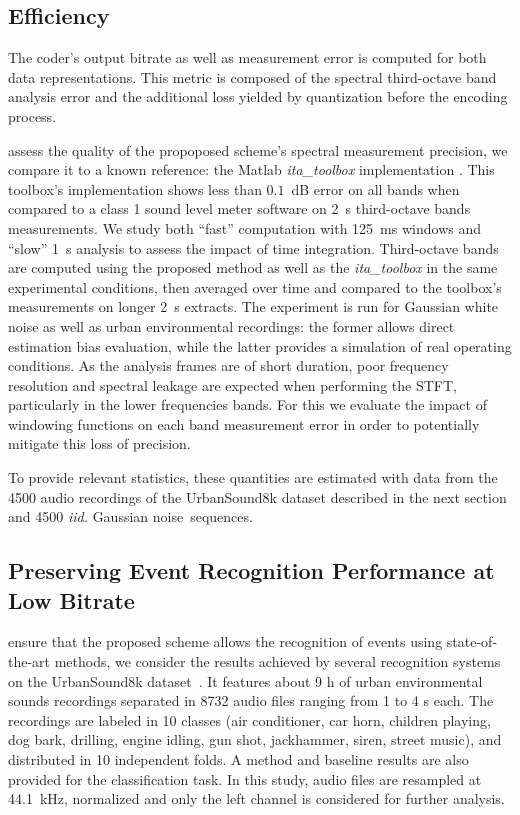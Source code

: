 \documentclass[sensors,article,accept,moreauthors,pdftex,10pt,a4paper]{mdpi}
\begin{document}
\subsection{Efficiency} \label{sec:efficiency_p}

The coder's output bitrate as well as measurement error is computed for both data representations. This metric is composed of the spectral third-octave band analysis error and the additional loss yielded by quantization before the encoding process.

 assess the quality of the propoposed scheme's spectral measurement precision, we compare it to a known reference: the Matlab \textit{ita\_toolbox} implementation \cite{itatoolbox2017}. This toolbox's implementation shows less than $0.1$~dB error on all bands when compared to a class 1 sound level meter software on 2~s third-octave bands measurements. We study both ``fast'' computation with 125~ms windows and ``slow'' 1~s analysis to assess the impact of time integration. Third-octave bands are computed using the proposed method as well as the \textit{ita\_toolbox} in the same experimental conditions, then averaged over time and compared to the toolbox's measurements on longer 2~s extracts. The experiment is run for Gaussian white noise as well as urban environmental recordings: the former allows direct estimation bias evaluation, while the latter provides a simulation of real operating conditions. As the analysis frames are of short duration, poor frequency resolution and spectral leakage are expected when performing the STFT, particularly in the lower frequencies bands. For this  we evaluate the impact of windowing functions on each band measurement error in order to potentially mitigate this loss of precision.

To provide relevant statistics, these quantities are estimated with data from the 4500 audio recordings of the UrbanSound8k dataset \cite{salamon2014} described in the next section and 4500 \textit{iid.} Gaussian \mbox{noise sequences.}

\subsection{Preserving Event Recognition Performance at Low Bitrate} \label{sec:event_p}

 ensure that the proposed scheme allows the recognition of events using state-of-the-art methods, we consider the results achieved by several recognition systems on the UrbanSound8k dataset~\cite{salamon2014}. It features about 9 h of urban environmental sounds recordings separated in 8732 audio files ranging from 1 to 4 s each. The recordings are labeled in 10 classes (air conditioner, car horn, children playing, dog bark, drilling, engine idling, gun shot, jackhammer, siren, street music), and distributed in 10 independent folds. A method and baseline results are also provided for the classification task. In this study, audio files are resampled at 44.1~kHz, normalized and only the left channel is considered for further analysis.
\end{document}
